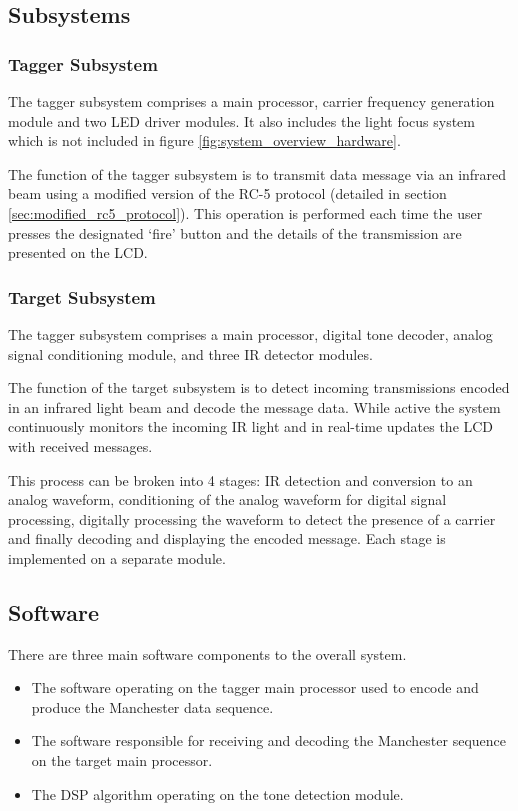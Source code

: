 \subsection{Subsystems}

\subsubsection{Tagger Subsystem}

The tagger subsystem comprises a main processor, carrier frequency generation module and two LED driver modules. It also includes the light focus system which is not included in figure \ref{fig:system_overview_hardware}.

The function of the tagger subsystem is to transmit data message via an infrared beam using a modified version of the RC-5 protocol (detailed in section \ref{sec:modified_rc5_protocol}). This operation is performed each time the user presses the designated `fire' button and the details of the transmission are presented on the LCD.


\subsubsection{Target Subsystem}

The tagger subsystem comprises a main processor, digital tone decoder, analog signal conditioning module, and three IR detector modules.

The function of the target subsystem is to detect incoming transmissions encoded in an infrared light beam and decode the message data. While active the system continuously monitors the incoming IR light and in real-time updates the LCD with received messages.

This process can be broken into 4 stages: IR detection and conversion to an analog waveform, conditioning of the analog waveform for digital signal processing, digitally processing the waveform to detect the presence of a carrier and finally decoding and displaying the encoded message. Each stage is implemented on a separate module.

\subsection{Software}

There are three main software components to the overall system.
\begin{itemize}
	\item The software operating on the tagger main processor used to encode and produce the Manchester data sequence.
	\item The software responsible for receiving and decoding the Manchester sequence on the target main processor.
	\item  The DSP algorithm operating on the tone detection module.
\end{itemize}






